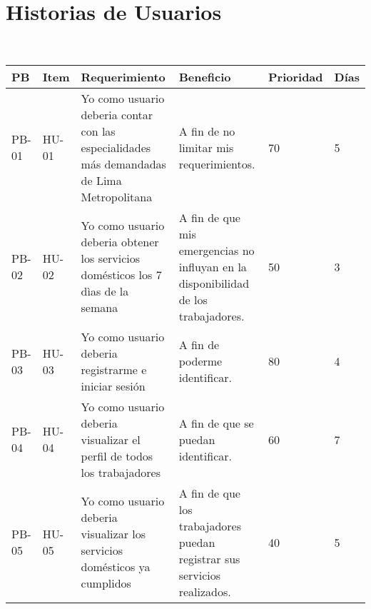 \chapter{Historias de Usuarios}\\
\centering
\begin{tabular}{ |p{1.2  cm}|p{1.2 cm}|p{3.5cm}|p{3.5cm}|p{1.2cm}|p{1.2 cm}|  }
	\hline
	\rowcolor{blue!40}  \textbf {PB} & \textbf{Item} & \textbf{Requerimiento} & \textbf{Beneficio} & \textbf{Prioridad}  & \textbf{Días}\\  \hline
	
	\centering PB-01 & \centering HU-01  & Yo como usuario deberia contar con las especialidades más demandadas de Lima Metropolitana  &  A fin de no limitar mis requerimientos. &  70 &  5 \\   \hline
	
	\centering PB-02 & \centering HU-02 &  Yo como usuario deberia obtener los servicios domésticos los 7 dìas de la semana  & A fin de que mis emergencias no influyan en la disponibilidad de los trabajadores.  &   50 & 3   \\   \hline
	
	\centering PB-03 & \centering HU-03  &  Yo como usuario deberia registrarme e iniciar sesión & A fin de poderme identificar. 
	 &   80 &   4  \\   \hline
	
	\centering PB-04 & \centering HU-04 &  Yo como usuario deberia visualizar el perfil de todos los trabajadores & A fin de que  se puedan identificar.  &   60 &   7  \\   \hline
	
	\centering PB-05 & \centering HU-05 &  Yo como usuario deberia visualizar los servicios domésticos ya cumplidos & A fin de que los trabajadores puedan registrar sus servicios realizados.  &   40 &   5  \\   \hline

	
\end{tabular}